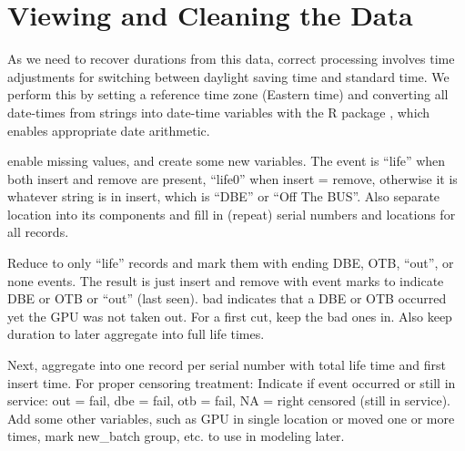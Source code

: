 \section{Viewing and Cleaning the Data}
\label{sec:clean}

As we need to recover durations from this data, correct processing
involves time adjustments for switching between daylight saving time
and standard time. We perform this by setting a reference time zone
(Eastern time) and converting all date-times from strings into
date-time variables  with the R
 package \cite{lubridate}, which enables appropriate
date arithmetic.

 enable missing values, and create some new
variables. The event is “life” when both insert and remove are
present, “life0” when insert = remove, otherwise it is whatever string
is in insert, which is “DBE” or “Off The BUS”. Also separate location
into its components and fill in (repeat) serial numbers and locations
for all records.

Reduce to only “life” records and mark them with ending DBE, OTB,
“out”, or none events. The result is just insert and remove with event
marks to indicate DBE or OTB or “out” (last seen). bad indicates that
a DBE or OTB occurred yet the GPU was not taken out. For a first cut,
keep the bad ones in. Also keep duration to later aggregate into full
life times.

Next, aggregate into one record per serial number with total life time
and first insert time. For proper censoring treatment: Indicate if
event occurred or still in service: out = fail, dbe = fail, otb =
fail, NA = right censored (still in service). Add some other
variables, such as GPU in single location or moved one or more times,
mark new\_batch group, etc. to use in modeling later.

